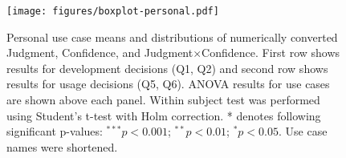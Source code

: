\begin{figure}[!hptb]
    \centering
    \texttt{[image: figures/boxplot-personal.pdf]}
    \caption{Personal use case means and distributions of numerically converted Judgment, Confidence, and Judgment$\times$Confidence. First row shows results for development decisions (Q1, Q2) and second row shows results for usage decisions (Q5, Q6). ANOVA results for use cases are shown above each panel. Within subject test was performed using Student's t-test with Holm correction. * denotes following significant p-values: $^{***}p<0.001$; $^{**}p<0.01$; $^{*}p<0.05$. Use case names were shortened.}
    \label{fig:use-case-effect-personal}
\end{figure}
